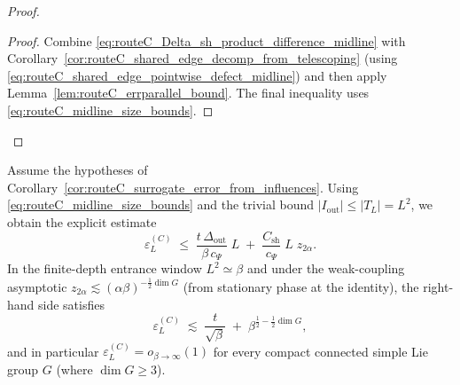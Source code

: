\begin{proof}
\begin{proof}
Combine \eqref{eq:routeC_Delta_sh_product_difference_midline} with Corollary~\ref{cor:routeC_shared_edge_decomp_from_telescoping}
(using \eqref{eq:routeC_shared_edge_pointwise_defect_midline}) and then apply Lemma~\ref{lem:routeC_errparallel_bound}.
The final inequality uses \eqref{eq:routeC_midline_size_bounds}.
\end{proof}


\end{proof}

\begin{remark}\label{rem:routeC_midline_scaling_epsilonC}
Assume the hypotheses of Corollary~\ref{cor:routeC_surrogate_error_from_influences}.
Using \eqref{eq:routeC_midline_size_bounds} and the trivial bound $|I_{\mathrm{out}}|\le |T_L|=L^2$, we obtain the explicit estimate
\begin{equation}\label{eq:routeC_epsilonC_midline_scaling}
\varepsilon_L^{(C)}
\;\le\;
\frac{t\,\Delta_{\mathrm{out}}}{\beta\,c_{\Psi}}\; L
\;+\;
\frac{C_{\mathrm{sh}}}{c_{\Psi}}\; L\; z_{2\alpha}.
\end{equation}
In the finite-depth entrance window $L^2\simeq \beta$ and under the weak-coupling asymptotic $z_{2\alpha}\lesssim (\alpha\beta)^{-\frac12\dim G}$
(from stationary phase at the identity), the right-hand side satisfies
\[
\varepsilon_L^{(C)}
\;\lesssim\;
\frac{t}{\sqrt{\beta}}
\;+\;
\beta^{\frac12-\frac12\dim G},
\]
and in particular $\varepsilon_L^{(C)}=o_{\beta\to\infty}(1)$ for every compact connected simple Lie group $G$ (where $\dim G\ge 3$).
\end{remark}

